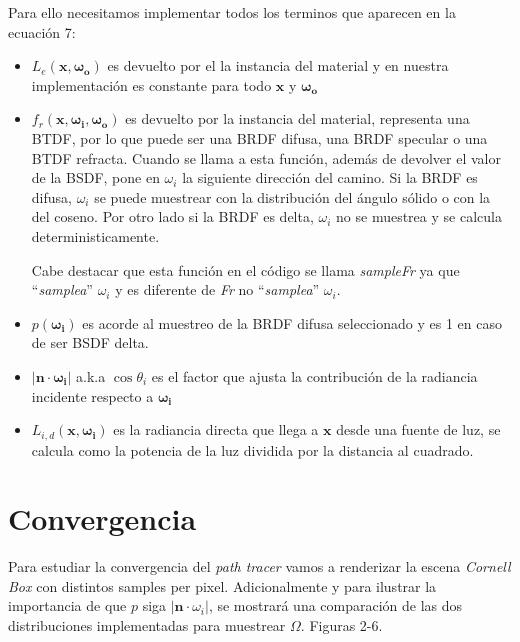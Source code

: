 \documentclass{article}
\begin{document}
Para ello necesitamos implementar todos los terminos que aparecen en la ecuación
7:

\begin{itemize}
  \item \(L_e(\mathbf{x}, \mathbf{\omega_{o}})\) es devuelto por el la instancia
        del material y en nuestra implementación es constante para todo
        \(\mathbf{x}\) y \(\mathbf{\omega_{o}}\)
  \item \(f_r(\mathbf{x}, \mathbf{\omega_{i}}, \mathbf{\omega_{o}}) \) es
        devuelto por la instancia del material, representa una BTDF, por lo que
        puede ser una BRDF difusa, una BRDF specular o una BTDF refracta. Cuando
        se llama a esta función, además de devolver el valor de la BSDF, pone en
        \(\omega_{i}\) la siguiente dirección del camino. Si la BRDF es difusa,
        \(\omega_{i}\) se puede muestrear con la distribución del ángulo sólido
        o con la del coseno. Por otro lado si la BRDF es delta, \(\omega_{i}\)
        no se muestrea y se calcula deterministicamente.

        Cabe destacar que esta función en el código se llama \textit{sampleFr}
        ya que ``\textit{samplea}'' \(\omega_{i}\) y es diferente de \textit{Fr}
        no ``\textit{samplea}'' \(\omega_{i}\).
  \item \(p(\mathbf{\omega_{i}})\) es acorde al muestreo de la BRDF difusa
        seleccionado y es 1 en caso de ser BSDF delta.
  \item \(|\mathbf{n} \cdot \mathbf{\omega_{i}}|\) a.k.a \(\cos\theta_{i}\) es
        el factor que ajusta la contribución de la radiancia incidente respecto
        a \(\mathbf{\omega_{i}}\)
  \item \(L_{i,d}(\mathbf{x}, \mathbf{\omega_{i}})\) es la radiancia directa que
        llega a \(\mathbf{x}\) desde una fuente de luz, se calcula como la
        potencia de la luz dividida por la distancia al cuadrado.
\end{itemize}

\section{Convergencia}

Para estudiar la convergencia del \textit{path tracer} vamos a renderizar la
escena \textit{Cornell Box} con distintos samples per pixel. Adicionalmente y
para ilustrar la importancia de que \(p\) siga \(|\mathbf{n}\cdot \omega_{i}|\),
se mostrará una comparación de las dos distribuciones implementadas para
muestrear \(\Omega\). Figuras 2-6.
\end{document}
